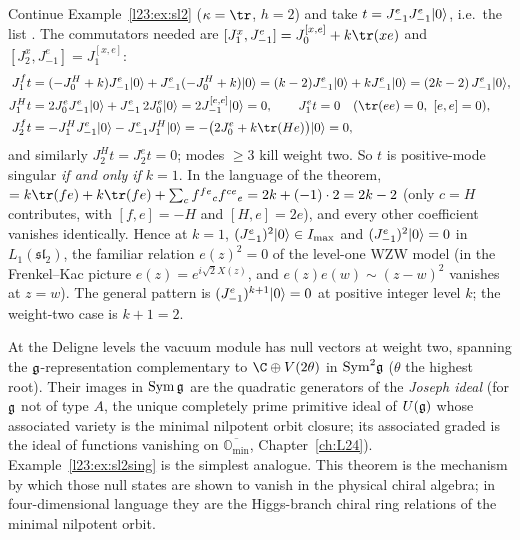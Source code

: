 \begin{example}\label{l23:ex:sl2sing}
Continue Example~\ref{l23:ex:sl2} ($\kappa=\tr$, $h=2$) and take $t=J^e_{-1}J^e_{-1}|0\rangle$, i.e.\ the list \lean{[(1, e, e)]}. The
commutators needed are $[J^x_1,J^e_{-1}]=J^{[x,e]}_0+k\tr(xe)$ and $[J^x_2,J^e_{-1}]=J^{[x,e]}_1$:
\begin{align*}
J^f_1t&=(-J^H_0+k)J^e_{-1}\lxxiiivac+J^e_{-1}(-J^H_0+k)\lxxiiivac=(k-2)J^e_{-1}\lxxiiivac+kJ^e_{-1}\lxxiiivac=(2k-2)\,J^e_{-1}\lxxiiivac,\\
J^H_1t&=2J^e_0J^e_{-1}\lxxiiivac+J^e_{-1}\,2J^e_0\lxxiiivac=2J^{[e,e]}_{-1}\lxxiiivac=0,\qquad J^e_1t=0\quad(\tr(ee)=0,\ [e,e]=0),\\
J^f_2t&=-J^H_1J^e_{-1}\lxxiiivac-J^e_{-1}J^H_1\lxxiiivac=-\big(2J^e_0+k\tr(He)\big)\lxxiiivac=0,
\end{align*}
and similarly $J^H_2t=J^e_2t=0$; modes $\ge3$ kill weight two. So $t$ is positive-mode singular \emph{if and only if $k=1$}. In the
language of the theorem,  $=k\tr(fe)+k\tr(fe)+\sum_cf^{fe}{}_cf^{ce}{}_e=2k+(-1)\cdot2=2k-2$ (only $c=H$
contributes, with $[f,e]=-H$ and $[H,e]=2e$), and every other coefficient vanishes identically. Hence at $k=1$,
$(J^e_{-1})^2|0\rangle\in I_{\max}$ and $(J^e_{-1})^2|0\rangle=0$ in $L_1(\mathfrak{sl}_2)$, the familiar relation $e(z)^2=0$ of the
level-one WZW model (in the Frenkel--Kac picture $e(z)=e^{i\sqrt2X(z)}$, and $e(z)e(w)\sim(z-w)^2$ vanishes at $z=w$). The general
pattern is $(J^e_{-1})^{k+1}|0\rangle=0$ at positive integer level $k$; the weight-two case is $k+1=2$.
\end{example}

\begin{physics}
At the Deligne levels the vacuum module has null vectors at weight two, spanning the $\mathfrak g$-representation complementary to
$\C\oplus V(2\theta)$ in $\mathrm{Sym}^2\mathfrak g$ ($\theta$ the highest root). Their images in $\mathrm{Sym}\,\mathfrak g$ are the quadratic
generators of the \emph{Joseph ideal} (for $\mathfrak g$ not of type $A$, the unique completely prime primitive ideal of $U(\mathfrak g)$
whose associated variety is the minimal nilpotent orbit closure; its associated graded is the ideal of functions vanishing on
$\overline{\mathbb O_{\min}}$, Chapter~\ref{ch:L24}). Example~\ref{l23:ex:sl2sing} is the simplest analogue. This theorem is the mechanism by which those
null states are shown to vanish in the physical chiral algebra; in four-dimensional language they are the Higgs-branch chiral
ring relations of the minimal nilpotent orbit.
\end{physics}

